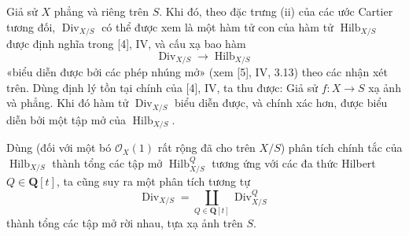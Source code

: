 Giả sử $X$ phẳng và riêng trên $S$. Khi đó, theo đặc trưng (ii) của các ước
Cartier tương đối, $\operatorname{Div}_{X/S}$ có thể được xem là một hàm tử
con của hàm tử $\operatorname{Hilb}_{X/S}$ được định nghĩa trong [4], IV, và
cấu xạ bao hàm
\[
\operatorname{Div}_{X/S}\longrightarrow\operatorname{Hilb}_{X/S}
\]
«biểu diễn được bởi các phép nhúng mở» (xem [5], IV, 3.13) theo các nhận xét
trên. Dùng định lý tồn tại chính của [4], IV, ta thu được:
 Giả sử $f:X\longrightarrow S$ xạ ảnh và phẳng. Khi đó
hàm tử $\operatorname{Div}_{X/S}$ biểu diễn được, và chính xác hơn, được biểu
diễn bởi một tập mở của $\operatorname{Hilb}_{X/S}$.

Dùng (đối với một bó $\mathcal O_X(1)$ rất rộng đã cho trên $X/S$) phân tích
chính tắc của $\operatorname{Hilb}_{X/S}$ thành tổng các tập mở
$\operatorname{Hilb}^{Q}_{X/S}$ tương ứng với các đa thức Hilbert
$Q\in\mathbf Q[t]$, ta cũng suy ra một phân tích tương tự
\[
\operatorname{Div}_{X/S}=
\coprod_{Q\in\mathbf Q[t]}\operatorname{Div}^{Q}_{X/S}
\]
thành tổng các tập mở rời nhau, tựa xạ ảnh trên $S$.

